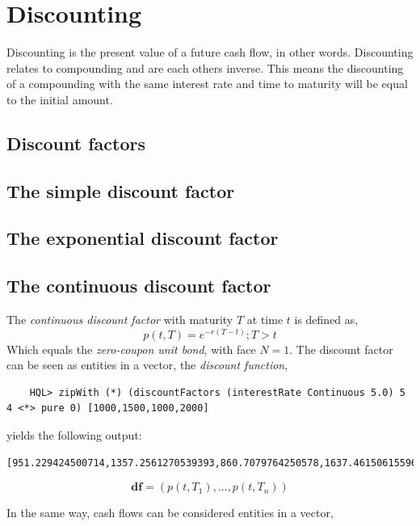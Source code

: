 \documentclass[11pt,a4paper]{article}
\numberwithin{equation}{section}
\begin{document}

	\section{Discounting}
	Discounting is the present value of a future cash flow, in other words. Discounting relates to compounding and are each others inverse. This means
	the discounting of a compounding with the same interest rate and time to maturity will be equal to the initial amount.

	\subsection{Discount factors}
	\subsection{The simple discount factor}
	\subsection{The exponential discount factor}
	\subsection{The continuous discount factor}
	The \textit{continuous discount factor} with maturity $T$ at time $t$ is defined as,
	\[
	p(t,T)=e^{-r(T-t)}; T>t
	\]
	Which equals the \textit{zero-coupon unit bond}, with face $N=1$. The discount factor
	can be seen as entities in a vector, the \textit{discount function},

	\FrameSep
	\begin{lstlisting}
	HQL> zipWith (*) (discountFactors (interestRate Continuous 5.0) 5 4 <*> pure 0) [1000,1500,1000,2000]
	\end{lstlisting}
	\FrameSep
	yields the following output:
	\FrameSep
	\begin{lstlisting}[style=Output]
	[951.229424500714,1357.2561270539393,860.7079764250578,1637.4615061559637]
	\end{lstlisting}
	\FrameSep

	\[
	\mathbf{df} = (p(t,T_1), ..., p(t,T_n))
	\]

	In the same way, cash flows can be considered entities in a vector,
\end{document}

